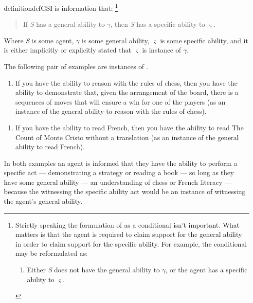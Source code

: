 \subsubsection{\Gsi{}}
\label{sec:type-scenario}

\begin{note}
    \begin{restatable}[\gsi{}]{definition}{defGSI}\label{def:gsi}
    \Gsi{-} is information that:\nolinebreak
    \footnote{
      Strictly speaking the formulation of \gsi{} as a conditional isn't important.
      What matters is that the agent is required to claim support for the general ability in order to claim support for the specific ability.
      For example, the conditional may be reformulated as:
      \begin{enumerate}[label=(\gsi{}\('\)), ref=(\gsi{}\('\))]
      \item Either \emph{S} does not have the general ability to \(\gamma\), or the agent has a specific ability to \(\varsigma\).
      \end{enumerate}
    }
    \begin{quote}
      If \emph{S} has a general ability to \(\gamma\), then \emph{S} has a specific ability to \(\varsigma\).
    \end{quote}
    Where \emph{S} is some agent, \(\gamma\) is some general ability, \(\varsigma\) is some specific ability, and it is either implicitly or explicitly stated that \(\varsigma\) is instance of \(\gamma\).
  \end{restatable}
  
  The following pair of examples are instances of \gsi{}.
  \begin{enumerate}[label=(\gsi{}:\arabic*), ref=(\gsi{}:\arabic*)]
  \item\label{qe:cond} If you have the ability to reason with the rules of chess, then you have the ability to demonstrate that, given the arrangement of the board, there is a sequences of moves that will ensure a win for one of the players (as an instance of the general ability to reason with the rules of chess).
  \end{enumerate}

  \begin{enumerate}[label=(\gsi{}:\arabic*), ref=(\gsi{}:\arabic*), resume]
  \item\label{qe:cond:french} If you have the ability to read French, then you have the ability to read The Count of Monte Cristo without a translation (as an instance of the general ability to read French).
  \end{enumerate}
  In both examples an agent is informed that they have the ability to perform a specific act --- demonstrating a strategy or reading a book --- so long as they have some general ability --- an understanding of chess or French literacy --- because the witnessing the specific ability act would be an instance of witnessing the agent's general ability.


\end{note}
